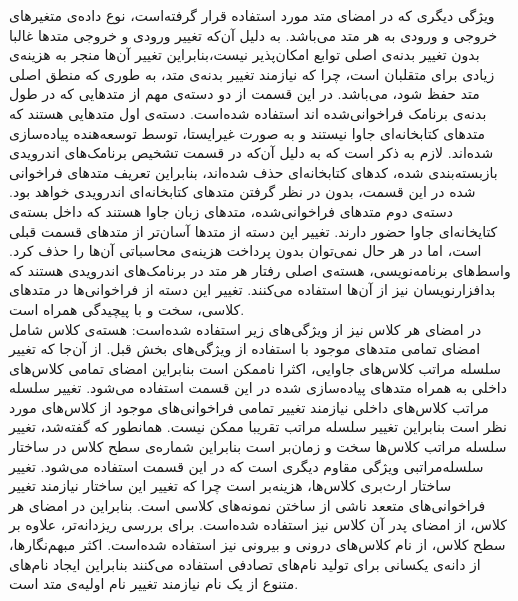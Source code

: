  ویژگی دیگری که در امضای متد مورد استفاده قرار گرفته‌است، نوع داده‌ی متغیر‌های خروجی و ورودی به هر متد می‌باشد. به دلیل آن‌که تغییر ورود‌ی و خروجی متد‌ها غالبا بدون تغییر بدنه‌ی اصلی توابع امکان‌پذیر نیست،‌بنابراین تغییر آن‌ها منجر به هزینه‌ی زیادی برای متقلبان است، چرا که نیازمند تغییر بدنه‌ی متد، به طوری که منطق اصلی متد حفظ شود، می‌باشد. 
 در این قسمت از دو دسته‌‌ی مهم از متد‌هایی که در طول بدنه‌ی برنامک فراخوانی‌شده اند استفاده شده‌است. دسته‌ی اول متد‌هایی هستند که متد‌های کتابخانه‌ای جاوا نیستند و به صورت غیرایستا،  توسط توسعه‌هنده پیاده‌سازی شده‌اند. لازم به ذکر است که به دلیل آن‌که در قسمت تشخیص برنامک‌های اندرویدی بازبسته‌بندی شده، کد‌های کتابخانه‌ای حذف شده‌اند، بنابراین تعریف متد‌های فراخوانی شده در این قسمت، بدون در نظر گرفتن متد‌های کتابخانه‌ای اندرویدی خواهد بود. دسته‌ی دوم متد‌های فراخوانی‌شده، متد‌های زبان جاوا هستند که داخل بسته‌ی کتایخانه‌ای جاوا حضور دارند. تغییر این دسته از متد‌ها آسان‌تر از متد‌های قسمت قبلی است، اما در هر حال نمی‌توان بدون پرداخت هزینه‌ی محاسباتی آن‌ها را حذف کرد.
 واسط‌های برنامه‌نویسی، هسته‌ی اصلی رفتار هر متد در برنامک‌های اندرویدی هستند که بدافزارنویسان نیز از آن‌ها استفاده می‌کنند. تغییر این دسته از فراخوانی‌ها در متد‌های کلاسی، سخت و با پیچیدگی همراه است.\\
در امضای هر کلاس نیز از ویژگی‌های زیر استفاده شده‌است: 
 هسته‌ی کلاس شامل امضای تمامی متد‌های موجود با استفاده از ویژگی‌های بخش قبل.
 از آن‌جا که تغییر سلسله مراتب کلاس‌های جاوایی، اکثرا ناممکن است بنابراین امضای تمامی کلاس‌های داخلی به همراه متد‌های پیاده‌سازی شده در این قسمت استفاده می‌شود. تغییر سلسله مراتب کلاس‌های داخلی نیازمند تغییر تمامی فراخوانی‌های موجود از کلاس‌های مورد نظر است بنابراین تغییر سلسله مراتب تقریبا ممکن نیست.
 همانطور که گفته‌شد، تغییر سلسله مراتب کلاس‌ها سخت و زمان‌بر است بنابراین شماره‌ی سطح کلاس در ساختار سلسله‌مراتبی ویژگی مقاوم دیگری است که در این قسمت استفاده می‌شود.
 تغییر ساختار ارث‌بری کلاس‌ها، هزینه‌بر است چرا که تغییر این ساختار نیازمند تغییر فراخوانی‌های متععد ناشی از ساختن نمونه‌های کلاسی است. بنابراین در امضای هر کلاس، از امضای پدر آن کلاس نیز استفاده شده‌است.
 برای بررسی ریزدانه‌تر، علاوه بر سطح کلاس، از نام کلاس‌های درونی و بیرونی نیز استفاده شده‌است. اکثر مبهم‌نگار‌ها، از دانه‌ی یکسانی برای تولید نام‌های تصادفی استفاده می‌کنند بنابراین ایجاد نام‌های متنوع از یک نام نیازمند تغییر نام اولیه‌ی متد است.
